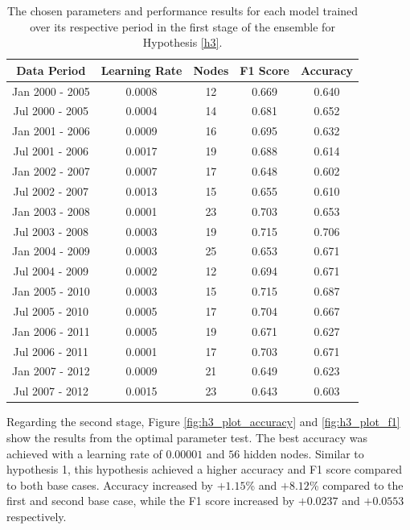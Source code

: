\documentclass{UoYCSproject}
\begin{document}
\begin{table}[h]
    \centering
    \begin{tabular}{|c|c|c|c|c|} \hline
        \textbf{Data Period} & \textbf{Learning Rate} & \textbf{Nodes} & \textbf{F1 Score} & \textbf{Accuracy} \\ \hline
        Jan 2000 - 2005 & 0.0008 & 12 & 0.669 & 0.640\\
        Jul 2000 - 2005 & 0.0004 & 14 & 0.681 & 0.652\\
        Jan 2001 - 2006 & 0.0009 & 16 & 0.695 & 0.632\\
        Jul 2001 - 2006 & 0.0017 & 19 & 0.688 & 0.614\\
        Jan 2002 - 2007 & 0.0007 & 17 & 0.648 & 0.602\\
        Jul 2002 - 2007 & 0.0013 & 15 & 0.655 & 0.610\\
        Jan 2003 - 2008 & 0.0001 & 23 & 0.703 & 0.653\\
        Jul 2003 - 2008 & 0.0003 & 19 & 0.715 & 0.706\\
        Jan 2004 - 2009 & 0.0003 & 25 & 0.653 & 0.671\\
        Jul 2004 - 2009 & 0.0002 & 12 & 0.694 & 0.671\\
        Jan 2005 - 2010 & 0.0003 & 15 & 0.715 & 0.687\\
        Jul 2005 - 2010 & 0.0005 & 17 & 0.704 & 0.667\\
        Jan 2006 - 2011 & 0.0005 & 19 & 0.671 & 0.627\\
        Jul 2006 - 2011 & 0.0001 & 17 & 0.703 & 0.671\\
        Jan 2007 - 2012 & 0.0009 & 21 & 0.649 & 0.623\\
        Jul 2007 - 2012 & 0.0015 & 23 & 0.643 & 0.603\\
        \hline
    \end{tabular}
    \caption{The chosen parameters and performance results for each model trained over its respective period in the first stage of the ensemble for Hypothesis \ref{h3}.}
    \label{tab:h3_stage1}
\end{table}

Regarding the second stage, Figure \ref{fig:h3_plot_accuracy} and \ref{fig:h3_plot_f1} show the results from the optimal parameter test. The best accuracy was achieved with a learning rate of $0.00001$ and $56$ hidden nodes. Similar to hypothesis 1, this hypothesis achieved a higher accuracy and F1 score compared to both base cases. Accuracy increased by $+1.15$\% and $+8.12$\% compared to the first and second base case, while the F1 score increased by $+0.0237$ and $+0.0553$ respectively.
\end{document}
